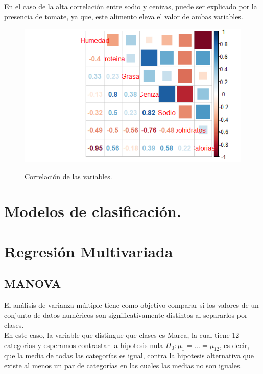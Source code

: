 \documentclass[12pt, letterpaper]{article}
\begin{document}
En el caso de la alta correlación entre sodio y cenizas, puede ser explicado por la presencia de tomate, ya que, este alimento eleva el valor de ambas variables.\\

\begin{figure}[h]
\centering
\includegraphics[scale=1]{images/corr.png} 
\label{i11}
\caption{Correlación de las variables.}
\end{figure}


 
 
\section{Modelos de clasificación.}

\pagebreak
\section{Regresión Multivariada}
\subsection{MANOVA}
El análisis de varianza múltiple tiene como objetivo comparar si los valores de un conjunto de datos numéricos son significativamente distintos al separarlos por clases.\\

En este caso, la variable que distingue que clases es Marca, la cual tiene 12 categorias y esperamos contrastar la hipotesis nula $H_0:\mu_1=\hdots=\mu_12$, es decir, que la media de todas las categorías es igual, contra la hipotesis alternativa que existe al menos un par de categorías en las cuales las medias no son iguales.\\
\end{document}
